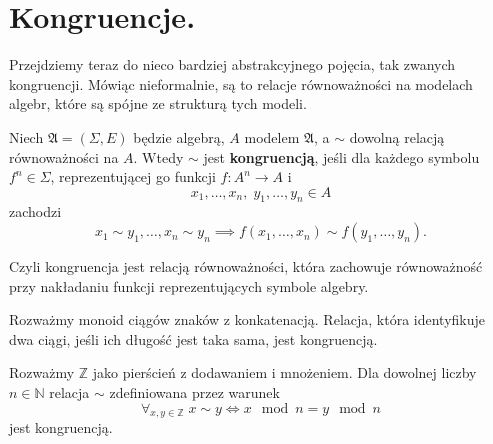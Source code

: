 \section{Kongruencje.}
Przejdziemy teraz do nieco bardziej abstrakcyjnego pojęcia,
	tak zwanych kongruencji.
Mówiąc nieformalnie,
	są to relacje równoważności na modelach algebr,
	które są spójne ze strukturą tych modeli.

\begin{definition}
	Niech $\mathfrak{A} = (\Sigma, E)$ będzie algebrą,
		$A$ modelem $\mathfrak{A}$,
		a $\sim$ dowolną relacją równoważności na $A$.
	Wtedy $\sim$ jest \textbf{kongruencją},
		jeśli dla każdego symbolu $f^n \in \Sigma$,
			reprezentującej go funkcji $f: A^n \to A$ i
	\begin{equation}
		x_1, \dots, x_n,\; y_1, \dots, y_n \in A
	\end{equation}
	 zachodzi
	\begin{equation}
		x_1 \sim y_1, \dots, x_n \sim y_n \implies f(x_1, \dots, x_n) \sim f(y_1, \dots, y_n).
	\end{equation}
\end{definition}

Czyli kongruencja jest relacją równoważności,
	która zachowuje równoważność przy nakładaniu funkcji reprezentujących symbole algebry.

\begin{example}
	Rozważmy monoid ciągów znaków z konkatenacją.
	Relacja, która identyfikuje dwa ciągi, jeśli ich długość jest taka sama,
		jest kongruencją.
\end{example}

\begin{example}
	Rozważmy $\mathbb{Z}$ jako pierścień z dodawaniem i mnożeniem.
	Dla dowolnej liczby $n \in \mathbb{N}$ relacja $\sim$ zdefiniowana przez warunek
	\begin{equation}
		\forall_{x, y \in \mathbb{Z}} \; x \sim y \iff x \mod n = y \mod n
	\end{equation}
	jest kongruencją.
\end{example}

